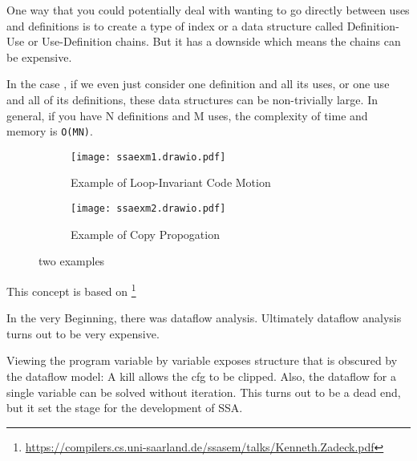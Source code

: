 One way that you could potentially deal with wanting to go directly between uses and definitions is to create a type of index or a data structure called Definition-Use or Use-Definition chains. But it has a downside which means the chains can be expensive.

In the case , if we even just consider one definition and all its uses, or one use and all of its definitions, these data structures can be non-trivially large. In general, if you have N definitions and M uses, the complexity of time and memory is \texttt{O(MN)}. 






\begin{figure}[h]
    \centering
    \begin{subfigure}[b]{0.4\textwidth}
        \centering
        \texttt{[image: ssaexm1.drawio.pdf]}
        \caption{Example of Loop-Invariant Code Motion}
        \label{fig:ssaexm1}
    \end{subfigure}
    \hfill
    \begin{subfigure}[b]{0.4\textwidth}
        \centering
        \texttt{[image: ssaexm2.drawio.pdf]}
        \caption{Example of Copy Propogation}
        \label{fig:ssaexm2}
    \end{subfigure}
      
    \caption{two examples}
\end{figure}




This concept is based on \footnote{\url{https://compilers.cs.uni-saarland.de/ssasem/talks/Kenneth.Zadeck.pdf}}


In the very Beginning, there was dataflow analysis.   Ultimately dataflow analysis turns out to be very expensive.

Viewing the program variable by variable exposes structure that is obscured by the dataflow model: 
A kill allows the cfg to be clipped. Also, the dataflow for a single variable can be solved
without iteration. This turns out to be a dead end, but it set the
stage for the development of SSA.


